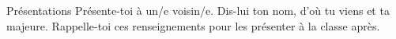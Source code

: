 \begin{frame}{Présentations}
  Présente-toi à un/e voisin/e.
  Dis-lui ton \alert{nom}, d'\alert{où} tu viens et ta \alert{majeure}.
  Rappelle-toi ces renseignements pour les présenter à la classe après.
\end{frame}
